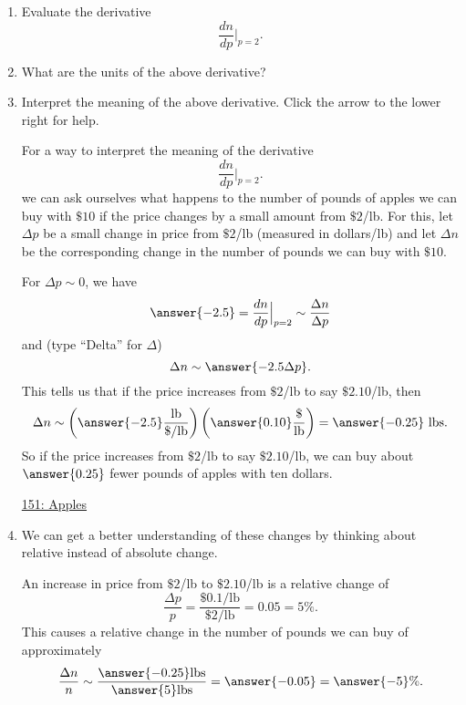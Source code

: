\documentclass{ximera}
\begin{document}
\begin{question}
\begin{enumerate}
\item Evaluate the derivative 
\[
         \frac{dn}{dp} \Big|_{p=2} . 
\]

\item What are the units of the above derivative?

\item Interpret the meaning of the above derivative. Click the arrow to the lower right for help.

\begin{expandable}

For a way to interpret the meaning of the derivative 
\[
         \frac{dn}{dp} \Big|_{p=2} . 
\]
we can ask ourselves what happens to the number of pounds of apples we can buy with $\$10$ if the price changes by a small amount from $\$2$/lb. For this, let $\Delta p$ be a small change in price from $\$2$/lb (measured in dollars/lb) and let $\Delta n$ be the corresponding change in the number of pounds we can buy with $\$10$.

For $\Delta p \sim 0$, we have
\[
    \answer{-2.5} =  \frac{dn}{dp} \Big|_{p=2} \sim \frac{\Delta n}{\Delta p} 
\]
and (type ``Delta'' for $\Delta$)
\[
     \Delta n \sim   \answer{-2.5 \Delta p}.
\]
This tells us that if the price increases from $\$2$/lb to say $\$2.10$/lb, then 
\[
   \Delta n \sim \left( \answer{-2.5} \frac{\text{lb}}{\$/\text{lb}} \right) \left( \answer{0.10} \frac{\$}{\text{lb}}  \right) =                        \answer{-0.25}\text{ lbs}.
\]
So if the price increases from $\$2$/lb to say $\$2.10$/lb, we can buy about $\answer{0.25}$ fewer pounds of apples with ten dollars. 

\begin{onlineOnly}
    \begin{center}
\end{center}
\end{onlineOnly}

\href{https://www.desmos.com/calculator/qw7wislq0c}{151: Apples}


\end{expandable}

\item We can get a better understanding of these changes by thinking about relative instead of absolute change.

An increase in price from $\$2$/lb to $\$2.10$/lb is a relative change of
\[
    \frac{\Delta p}{p} = \frac{\$0.1/\text{lb}}{\$ 2/\text{lb}} = 0.05 = 5\% .
\]
This causes a relative change in the number of pounds we can buy of approximately
\[
    \frac{\Delta n}{n} \sim \frac{\answer{-0.25} \text{lbs}}{\answer{5}\text{lbs}} = \answer{-0.05} = \answer{-5}\%.
\]
 

\end{enumerate}
\end{question}
\end{document}
